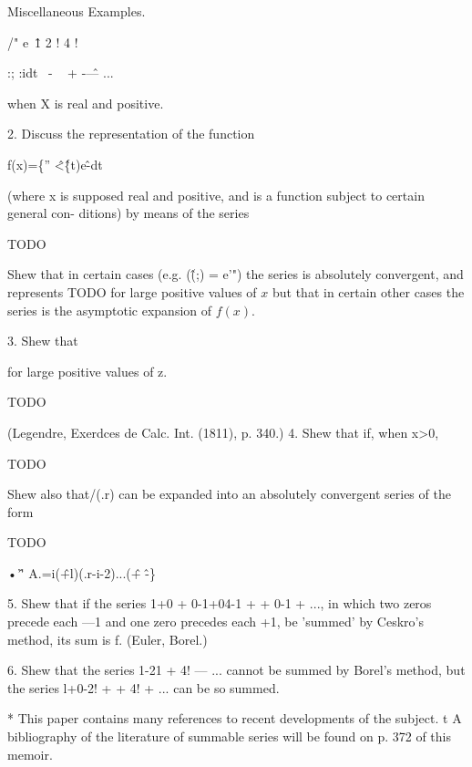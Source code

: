 Miscellaneous Examples.

/" e~\^ 1 2 ! 4 !

:; :idt~ - ~ + -\^ — ...

when X is real and positive.

2. Discuss the representation of the function

f(x)=\{'' \^<\^\{t)e\^-dt

(where x is supposed real and positive, and is a function subject to certain general con-
ditions) by means of the series

TODO

Shew that in certain cases (e.g. (\^(;) = e'") the series is absolutely convergent, and
represents TODO for large positive values of $x$ but that in certain other cases the series is
the asymptotic expansion of $f(x)$.



3. Shew that



for large positive values of z.

TODO

(Legendre, Exerdces de Calc. Int. (1811), p. 340.)
4. Shew that if, when x>0,

TODO

Shew also that/(.r) can be expanded into an absolutely convergent series of the form

TODO

•'\^ ' A.=i(\^+l)(.r-i-2)...(\^ + \^-\}

5. Shew that if the series 1+0 + 0-1+04-1 + + 0-1 + ..., in which two zeros
precede each —1 and one zero precedes each +1, be 'summed' by Ceskro's method,
its sum is f. (Euler, Borel.)

6. Shew that the series 1-21 + 4! — ... cannot be summed by Borel's method, but the
series l+0-2! + + 4! + ... can be so summed.

* This paper contains many references to recent developments of the subject.
t A bibliography of the literature of summable series will be found on p. 372 of this
memoir.